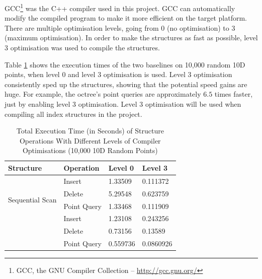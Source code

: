 GCC\footnote{GCC, the GNU Compiler Collection -- \url{http://gcc.gnu.org/}} was the C++ compiler used in this project. GCC can automatically modify the compiled program to make it more efficient on the target platform. There are multiple optimisation levels, going from 0 (no optimisation) to 3 (maximum optimisation). In order to make the structures as fast as possible, level 3 optimisation was used to compile the structures.

Table \ref{tab:compiler-optimisation} shows the execution times of the two baselines on 10,000 random 10D points, when level 0 and level 3 optimisation is used. Level 3 optimisation consistently sped up the structures, showing that the potential speed gains are huge. For example, the octree's point queries are approximately $6.5$ times faster, just by enabling level 3 optimisation. Level 3 optimisation will be used when compiling all index structures in the project.

\begin{table}
	\centering
	\begin{tabular}{|l|l|l|l|}
		\hline
		\textbf{Structure} & \textbf{Operation} & \textbf{Level 0} & \textbf{Level 3} \\
		\hline
		\multirow{ 4}{*}{Sequential Scan} & Insert & 1.33509 & 0.111372 \\
		 & Delete & 5.29548 & 0.623759 \\
		 & Point Query & 1.33468 & 0.111909 \\
		\hline
		\multirow{ 4}{*}{Octree} & Insert & 1.23108 & 0.243256 \\
		 & Delete & 0.73156 & 0.13589 \\
		 & Point Query & 0.559736 & 0.0860926 \\
		 \hline
	\end{tabular}
	\caption{Total Execution Time (in Seconds) of Structure Operations With Different Levels of Compiler Optimisations (10,000 10D Random Points)}
	\label{tab:compiler-optimisation}
\end{table}